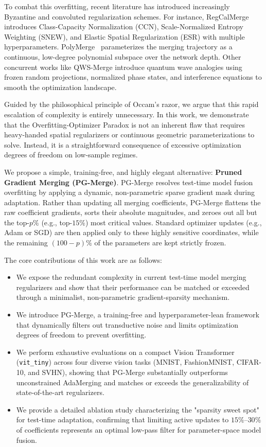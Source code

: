 To combat this overfitting, recent literature has introduced increasingly Byzantine and convoluted regularization schemes. For instance, RegCalMerge~\cite{regcalmerge} introduces Class-Capacity Normalization (CCN), Scale-Normalized Entropy Weighting (SNEW), and Elastic Spatial Regularization (ESR) with multiple hyperparameters. PolyMerge~\cite{polymerge} parameterizes the merging trajectory as a continuous, low-degree polynomial subspace over the network depth. Other concurrent works like QWS-Merge introduce quantum wave analogies using frozen random projections, normalized phase states, and interference equations to smooth the optimization landscape.

Guided by the philosophical principle of Occam's razor, we argue that this rapid escalation of complexity is entirely unnecessary. In this work, we demonstrate that the Overfitting-Optimizer Paradox is not an inherent flaw that requires heavy-handed spatial regularizers or continuous geometric parameterizations to solve. Instead, it is a straightforward consequence of excessive optimization degrees of freedom on low-sample regimes. 

We propose a simple, training-free, and highly elegant alternative: \textbf{Pruned Gradient Merging (PG-Merge)}. PG-Merge resolves test-time model fusion overfitting by applying a dynamic, non-parametric sparse gradient mask during adaptation. Rather than updating all merging coefficients, PG-Merge flattens the raw coefficient gradients, sorts their absolute magnitudes, and zeroes out all but the top-$p\%$ (e.g., top-$15\%$) most critical values. Standard optimizer updates (e.g., Adam or SGD) are then applied only to these highly sensitive coordinates, while the remaining $(100-p)\%$ of the parameters are kept strictly frozen.

The core contributions of this work are as follows:
\begin{itemize}
    \item We expose the redundant complexity in current test-time model merging regularizers and show that their performance can be matched or exceeded through a minimalist, non-parametric gradient-sparsity mechanism.
    \item We introduce PG-Merge, a training-free and hyperparameter-lean framework that dynamically filters out transductive noise and limits optimization degrees of freedom to prevent overfitting.
    \item We perform exhaustive evaluations on a compact Vision Transformer (\texttt{vit\_tiny}) across four diverse vision tasks (MNIST, FashionMNIST, CIFAR-10, and SVHN), showing that PG-Merge substantially outperforms unconstrained AdaMerging and matches or exceeds the generalizability of state-of-the-art regularizers.
    \item We provide a detailed ablation study characterizing the "sparsity sweet spot" for test-time adaptation, confirming that limiting active updates to $15\%$--$30\%$ of coefficients represents an optimal low-pass filter for parameter-space model fusion.
\end{itemize}